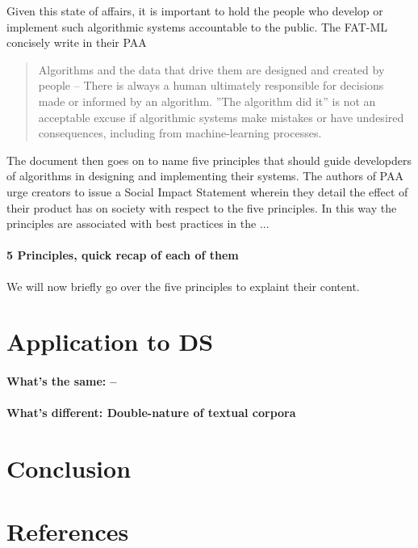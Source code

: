 \documentclass{article}
\begin{document}
Given this state of affairs, it is important to hold the people who develop or implement such algorithmic systems accountable to the public. The FAT-ML concisely write in their PAA \cite{principles}
\begin{quote}
Algorithms and the data that drive them are designed and created by people -- There is always a human ultimately responsible for decisions made or informed by an algorithm. ''The algorithm did it'' is not an acceptable excuse if algorithmic systems make mistakes or have undesired consequences, including from machine-learning processes.
\end{quote}

The document then goes on to name five principles that should guide developders of algorithms in designing and implementing their systems. The authors of PAA urge creators to issue a Social Impact Statement wherein they detail the effect of their product has on society with respect to the five principles. In this way the principles are associated with best practices in the ...

\paragraph{5 Principles, quick recap of each of them}

We will now briefly go over the five principles to explaint their content.



\section{Application to DS}\hypertarget{sec4}{ }
\paragraph{What's the same: --}
\paragraph{What's different: Double-nature of textual corpora}
\section{Conclusion}

\section{References}\hypertarget{sec5}{ }
\end{document}
